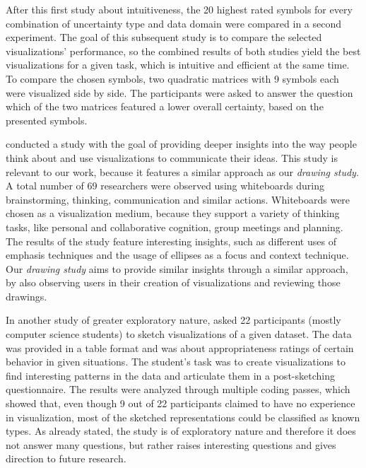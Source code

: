 After this first study about intuitiveness, the 20 highest rated symbols for every combination of uncertainty type and data domain were compared in a second experiment. The goal of this subsequent study is to compare the selected visualizations' performance, so the combined results of both studies yield the best visualizations for a given task, which is intuitive and efficient at the same time. To compare the chosen symbols, two quadratic matrices with 9 symbols each were visualized side by side. The participants were asked to answer the question which of the two matrices featured a lower overall certainty, based on the presented symbols.  \par \medskip

\citet{walny2011visual} conducted a study with the goal of providing deeper insights into the way people think about and use visualizations to communicate their ideas. This study is relevant to our work, because it features a similar approach as our \textit{drawing study}. A total number of 69 researchers were observed using whiteboards during brainstorming, thinking, communication and similar actions. Whiteboards were chosen as a visualization medium, because they support a variety of thinking tasks, like personal and collaborative cognition, group meetings and planning. The results of the study feature interesting insights, such as different uses of emphasis techniques and the usage of ellipses as a focus and context technique. Our \textit{drawing study} aims to provide similar insights through a similar approach, by also observing users in their creation of visualizations and reviewing those drawings.\par \medskip

In another study of greater exploratory nature, \citet{walny2015exploratory} asked 22 participants (mostly computer science students) to sketch visualizations of a given dataset. The data was provided in a table format and was about appropriateness ratings of certain behavior in given situations. The student's task was to create visualizations to find interesting patterns in the data and articulate them in a post-sketching questionnaire. The results were analyzed through multiple coding passes, which showed that, even though 9 out of 22 participants claimed to have no experience in visualization, most of the sketched representations could be classified as known types.  As already stated, the study is of exploratory nature and therefore it does not answer many questions, but rather raises interesting questions and gives direction to future research.\par \medskip

